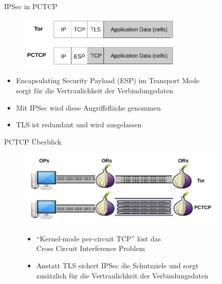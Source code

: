 \documentclass{beamer}
\begin{document}
\begin{frame}{IPSec in PCTCP}{\secname}
  \begin{figure}[h]
    \begin{center}
      \includegraphics[width=0.7\textwidth]{pics/PCTCP_header.pdf}
    \end{center}
  \end{figure}
  \begin{itemize}
    \item Encapsulating Security Payload (ESP) im Transport Mode \\
          sorgt für die Vertraulichkeit der Verbindungsdaten
    \item Mit IPSec wird diese Angriffsfläche genommen
    \item TLS ist redundant und wird ausgelassen
  \end{itemize}
\end{frame}


\begin{frame}{PCTCP Überblick}{\secname}
  \begin{figure}
    \begin{center}
      \includegraphics[width=0.9\textwidth]{pics/PCTCP_design.pdf}
    \end{center}
  \begin{itemize}
    \item ``Kernel-mode per-circuit TCP'' löst das\\
          Cross Circuit Interference Problem
    \item Anstatt TLS sichert IPSec die Schutzziele und sorgt\\
          zusätzlich für die Vertraulichkeit der Verbindungsdaten
  \end{itemize}
  \end{figure} 
\end{frame}
\end{document}
